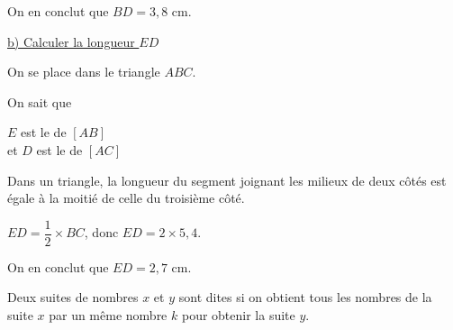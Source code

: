 On en conclut que $BD = 3,8$ cm.

\bigskip 

\underline{b) Calculer la longueur $ED$}

\bigskip 
On se place dans le triangle $ABC$.\\

\begin{labeling}{On sait que } 
\item [On sait que ] $E$ est le   de $[AB]$ \\
                  et $D$ est le   de $[AC]$
\item [Or, ] Dans un triangle, la longueur du segment joignant les milieux  de deux côtés est  
    égale à la moitié de celle du troisième côté. 
\item [Donc] $ED=\dfrac{1}{2}\times BC$, donc $ED= 2 \times 5,4$.
\end{labeling}

On en conclut que $ED = 2,7$ cm.

\newpage        


             



\bigskip 

Deux suites de nombres $x$ et $y$ sont dites   si on obtient tous les nombres de la suite $x$ par un même nombre $k$ pour obtenir la suite $y$.

\bigskip 



